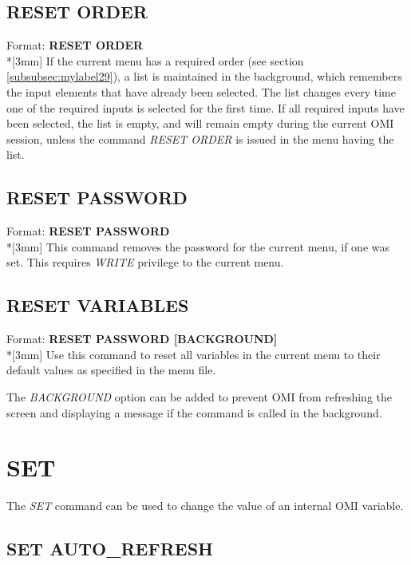 \documentclass[a4paper]{book}
\renewcommand{\indent}{\hspace*{5mm}}
\begin{document}
\subsection{RESET ORDER}
\label{subsubsec:mylabel72}

\indent Format: \textbf{RESET ORDER}\\*[3mm]
If the current menu has a required order (see section 
\ref{subsubsec:mylabel29}), a list is maintained in the background, 
which remembers the input elements that have already been selected. The list 
changes every time one of the required inputs is selected for the first 
time. If all required inputs have been selected, the list is empty, and will 
remain empty during the current OMI session, unless the command \textsl{RESET ORDER} 
is issued in the menu having the list.

\subsection{RESET PASSWORD}
\label{subsubsec:mylabel73}

\indent Format: \textbf{RESET PASSWORD}\dag\\*[3mm]
This command removes the password for the current menu, if one was set. This 
requires \textsl{WRITE} privilege to the current menu.

\subsection{RESET VARIABLES}
\label{subsubsec:resetvar}

\indent Format: \textbf{RESET PASSWORD [BACKGROUND]}\\*[3mm]
Use this command to reset all variables in the current menu to
their default values as specified in the menu file.

The \textsl{BACKGROUND} option can be added to prevent OMI from refreshing the
screen and displaying a message if the command is called in the background.

\section{SET}
\label{subsec:mylabel20}

The \textsl{SET} command can be used to change the value of an internal OMI variable.

\subsection{SET AUTO{\_}REFRESH}
\label{subsubsec:mylabel74}
\end{document}
